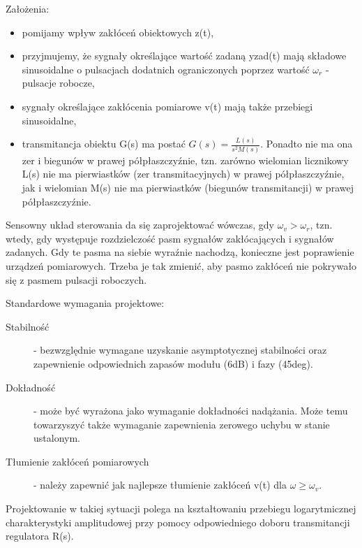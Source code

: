 Założenia:
\begin{itemize}
    \item pomijamy wpływ zakłóceń obiektowych z(t),
    \item przyjmujemy, że sygnały określające wartość zadaną yzad(t) mają składowe sinusoidalne o pulsacjach dodatnich ograniczonych poprzez wartość $\omega_r$ - pulsacje robocze,
    \item sygnały określające zakłócenia pomiarowe v(t) mają także przebiegi sinusoidalne,
    \item transmitancja obiektu G(s) ma postać $G(s) = \frac{L(s)}{s^2M(s)}$. Ponadto nie ma ona zer i biegunów w prawej półpłaszczyźnie, tzn. zarówno wielomian licznikowy L(s) nie ma pierwiastków (zer transmitacyjnych) w prawej półpłaszczyźnie, jak i wielomian M(s) nie ma pierwiastków (biegunów transmitancji) w prawej półpłaszczyźnie.
\end{itemize}

Sensowny układ sterowania da się zaprojektować wówczas, gdy $\omega_v > \omega_r$, tzn. wtedy, gdy występuje rozdzielczość pasm sygnałów zakłócających i sygnałów zadanych. Gdy te pasma na siebie wyraźnie nachodzą, konieczne jest poprawienie urządzeń pomiarowych. Trzeba je tak zmienić, aby pasmo zakłóceń nie pokrywało się z pasmem pulsacji roboczych.

Standardowe wymagania projektowe:
\begin{description}
    \item[Stabilność] - bezwzględnie wymagane uzyskanie asymptotycznej stabilności oraz zapewnienie odpowiednich zapasów modułu (6dB) i fazy (45deg).
    \item[Dokładność] - może być wyrażona jako wymaganie dokładności nadążania. Może temu towarzyszyć także wymaganie zapewnienia zerowego uchybu w stanie ustalonym.
    \item[Tłumienie zakłóceń pomiarowych] - należy zapewnić jak najlepsze tłumienie zakłóceń v(t) dla $\omega \geq \omega_v$.
\end{description}

Projektowanie w takiej sytuacji polega na kształtowaniu przebiegu logarytmicznej charakterystyki amplitudowej przy pomocy odpowiedniego doboru transmitancji regulatora R(s).

